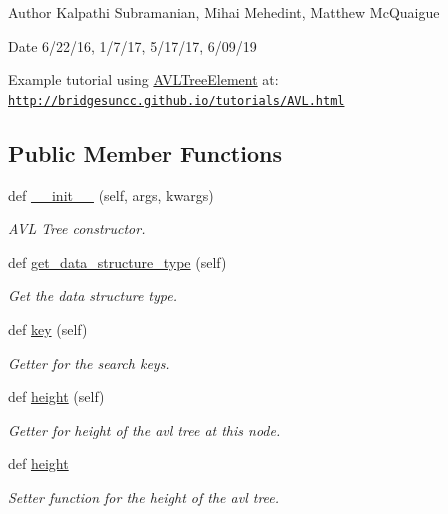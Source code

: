 \begin{DoxyAuthor}{Author}
Kalpathi Subramanian, Mihai Mehedint, Matthew Mc\+Quaigue
\end{DoxyAuthor}
\begin{DoxyDate}{Date}
6/22/16, 1/7/17, 5/17/17, 6/09/19
\end{DoxyDate}
Example tutorial using \hyperlink{classbridges_1_1avl__tree__element_1_1_a_v_l_tree_element}{A\+V\+L\+Tree\+Element} at\+: \href{http://bridgesuncc.github.io/tutorials/AVL.html}{\tt http\+://bridgesuncc.\+github.\+io/tutorials/\+A\+V\+L.\+html} \subsection*{Public Member Functions}
\begin{DoxyCompactItemize}
\item 
def \hyperlink{classbridges_1_1avl__tree__element_1_1_a_v_l_tree_element_a1b3255d91449ada8e7347bd78f166d84}{\+\_\+\+\_\+init\+\_\+\+\_\+} (self, args, kwargs)
\begin{DoxyCompactList}\small\item\em A\+VL Tree constructor. \end{DoxyCompactList}\item 
def \hyperlink{classbridges_1_1avl__tree__element_1_1_a_v_l_tree_element_a550eaee1c1de211c69a2cfc6d89544fe}{get\+\_\+data\+\_\+structure\+\_\+type} (self)
\begin{DoxyCompactList}\small\item\em Get the data structure type. \end{DoxyCompactList}\item 
def \hyperlink{classbridges_1_1avl__tree__element_1_1_a_v_l_tree_element_aa98417f116a2fa96bb4fd57a009a8517}{key} (self)
\begin{DoxyCompactList}\small\item\em Getter for the search keys. \end{DoxyCompactList}\item 
def \hyperlink{classbridges_1_1avl__tree__element_1_1_a_v_l_tree_element_ac262e026e103fc407f585dfc4dcfab9f}{height} (self)
\begin{DoxyCompactList}\small\item\em Getter for height of the avl tree at this node. \end{DoxyCompactList}\item 
def \hyperlink{classbridges_1_1avl__tree__element_1_1_a_v_l_tree_element_a0ee04b3b15bbb37562e15fd882f1b0cd}{height}
\begin{DoxyCompactList}\small\item\em Setter function for the height of the avl tree. \end{DoxyCompactList}\item 

\end{DoxyCompactItemize}
